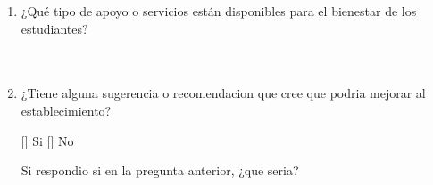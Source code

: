 \documentclass{article}
\begin{document}
\begin{enumerate}[leftmargin=*, label=\arabic*.]
    \item ¿Qué tipo de apoyo o servicios están disponibles para el bienestar de los estudiantes? \\[0.5cm]
        \underline{\hspace{0.95\linewidth}} \vspace{0.3cm} \\
        \underline{\hspace{0.95\linewidth}} \vspace{0.3cm} \\
        \underline{\hspace{0.95\linewidth}} \vspace{0.3cm}
    \item ¿Tiene alguna sugerencia o recomendacion que cree que podria mejorar al establecimiento?
    \begin{center}
        [\hspace*{0.25cm}] Si \hspace{1cm} [\hspace*{0.25cm}] No
    \end{center}
    Si respondio si en la pregunta anterior, ¿que seria? \\[0.5cm]
        \underline{\hspace{0.95\linewidth}} \vspace{0.3cm} \\
        \underline{\hspace{0.95\linewidth}} \vspace{0.3cm} \\
        \underline{\hspace{0.95\linewidth}} \vspace{0.3cm}

\end{enumerate}
\end{document}
